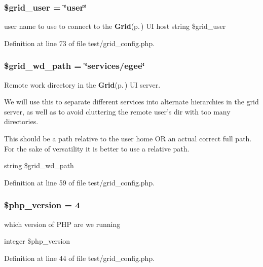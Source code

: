 \subsubsection{\setlength{\rightskip}{0pt plus 5cm}\$grid\_\-user = \char`\"{}user\char`\"{}}\label{test_2grid__config_8php_a3}


user name to use to connect to the {\bf Grid}{\rm (p.\,\pageref{classGrid})} UI host  string \$grid\_\-user 



Definition at line 73 of file test/grid\_\-config.php.
\subsubsection{\setlength{\rightskip}{0pt plus 5cm}\$grid\_\-wd\_\-path = \char`\"{}services/egee\char`\"{}}\label{test_2grid__config_8php_a1}


Remote work directory in the {\bf Grid}{\rm (p.\,\pageref{classGrid})} UI server. 

We will use this to separate different services into alternate hierarchies in the grid server, as well as to avoid cluttering the remote user's dir with too many directories.

This should be a path relative to the user home OR an actual correct full path. For the sake of versatility it is better to use a relative path.

string \$grid\_\-wd\_\-path 

Definition at line 59 of file test/grid\_\-config.php.
\subsubsection{\setlength{\rightskip}{0pt plus 5cm}\$php\_\-version = 4}\label{test_2grid__config_8php_a0}


which version of PHP are we running 

integer \$php\_\-version 

Definition at line 44 of file test/grid\_\-config.php.